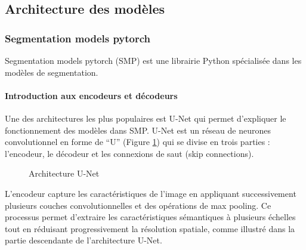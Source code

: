 \subsection{Architecture des modèles} %
\subsubsection{Segmentation models pytorch}
Segmentation models pytorch (SMP) \cite{noauthor_welcome_nodate} est une librairie Python spécialisée dans les modèles de segmentation.
\paragraph{Introduction aux encodeurs et décodeurs}
Une des architectures les plus populaires est U-Net \cite{ronneberger_u-net_2015} qui permet d'expliquer le fonctionnement des modèles dans SMP. U-Net est un réseau de neurones convolutionnel en forme de ``U'' (Figure \ref{fig:ch36_architecture_01_architecture_unet}) qui se divise en trois parties : l'encodeur, le décodeur et les connexions de saut (skip connections).

\begin{figure}[H]
    \centering
    \caption{Architecture U-Net \cite{ronneberger_u-net_2015}}
    \label{fig:ch36_architecture_01_architecture_unet}
\end{figure}

L'encodeur capture les caractéristiques de l'image en appliquant successivement plusieurs couches convolutionnelles et des opérations de max pooling. Ce processus permet d'extraire les caractéristiques sémantiques à plusieurs échelles tout en réduisant progressivement la résolution spatiale, comme illustré dans la partie descendante de l'architecture U-Net.

